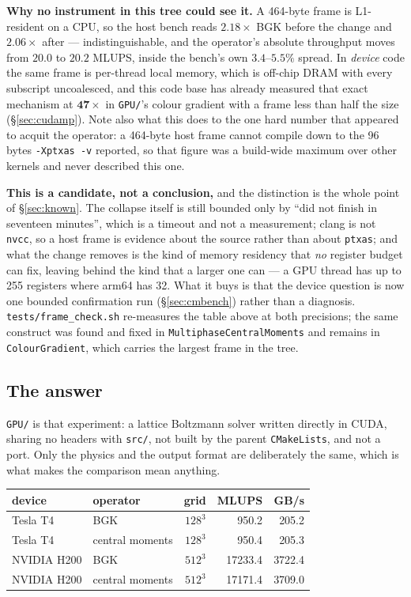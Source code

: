 \documentclass[11pt,a4paper]{article}
\newcommand{\code}[1]{\texttt{\small #1}}
\begin{document}
\textbf{Why no instrument in this tree could see it.} A 464-byte frame is
L1-resident on a CPU, so the host bench reads $2.18\times$ BGK before the change
and $2.06\times$ after --- indistinguishable, and the operator's absolute
throughput moves from $20.0$ to $20.2$ MLUPS, inside the bench's own $3.4$--$5.5\%$
spread. In \emph{device} code the same frame is per-thread local memory, which
is off-chip DRAM with every subscript uncoalesced, and this code base has
already measured that exact mechanism at $\mathbf{47\times}$ in \code{GPU/}'s
colour gradient with a frame less than half the size
(\S\ref{sec:cudamp}). Note also what this does to the one hard number that
appeared to acquit the operator: a 464-byte host frame cannot compile down to
the 96 bytes \code{-Xptxas -v} reported, so that figure was a build-wide maximum
over other kernels and never described this one.

\textbf{This is a candidate, not a conclusion,} and the distinction is the whole
point of \S\ref{sec:known}. The collapse itself is still bounded only by ``did
not finish in seventeen minutes'', which is a timeout and not a measurement;
clang is not \code{nvcc}, so a host frame is evidence about the source rather
than about \code{ptxas}; and what the change removes is the kind of memory
residency that \emph{no} register budget can fix, leaving behind the kind that a
larger one can --- a GPU thread has up to 255 registers where arm64 has 32. What
it buys is that the device question is now one bounded confirmation run
(\S\ref{sec:cmbench}) rather than a diagnosis. \code{tests/frame\_check.sh}
re-measures the table above at both precisions; the same construct was found and
fixed in \code{MultiphaseCentralMoments} and remains in \code{ColourGradient},
which carries the largest frame in the tree.

\subsection{The answer}

\code{GPU/} is that experiment: a lattice Boltzmann solver written directly in
CUDA, sharing no headers with \code{src/}, not built by the parent
\code{CMakeLists}, and not a port. Only the physics and the output format are
deliberately the same, which is what makes the comparison mean anything.

\begin{center}\small
\begin{tabular}{llrrr}
\toprule
device & operator & grid & MLUPS & GB/s \\
\midrule
Tesla T4  & BGK             & $128^3$ & 950.2  & 205.2 \\
Tesla T4  & central moments & $128^3$ & 950.4  & 205.3 \\
NVIDIA H200 & BGK             & $512^3$ & 17233.4 & 3722.4 \\
NVIDIA H200 & central moments & $512^3$ & 17171.4 & 3709.0 \\
\bottomrule
\end{tabular}
\end{center}
\end{document}
